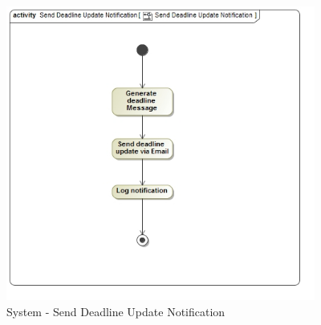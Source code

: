 \documentclass{article}
\begin{document}
			\begin{figure}[H]
				\includegraphics[width=4in, center]{../Diagrams/Process Specifications//Notification subsystem/Send Deadline Update Notification.jpg}
				\caption{System - Send Deadline Update Notification}
			\end{figure}
\end{document}
